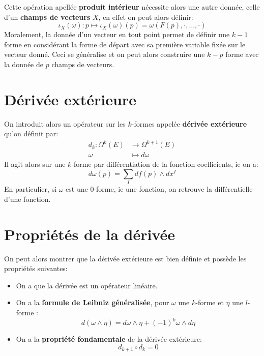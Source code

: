       Cette opération apellée \textbf{produit intérieur} nécessite alors une autre donnée, celle d'un \textbf{champs de vecteurs} $X$, en effet on peut alors définir:
      $$
         \iota_X(\omega) : p \mapsto \iota_X(\omega)(p) = \omega(F(p), \cdot, \ldots, \cdot)
      $$
      Moralement, la donnée d'un vecteur en tout point permet de définir une $k-1$ forme en considérant la forme de départ avec sa première variable fixée sur le vecteur donné. Ceci se généralise et on peut alors construire une \( k-p \) forme avec la donnée de \( p \) champs de vecteurs.
   \section{Dérivée extérieure}
   On introduit alors un opérateur sur les \(k\)-formes appelée \textbf{dérivée extérieure} qu'on définit par:
   \begin{align*}
      d_k : \Omega^k(E) &\longrightarrow \Omega^{k+1}(E)\\
      \omega &\longmapsto d\omega
   \end{align*}
   Il agit alors sur une \(k\)-forme par différentiation de la fonction coefficients, ie on a:
   \[
      d\omega(p) = \sum_I df(p) \wedge dx^I
   \]
   En particulier, si \( \omega \) est une \( 0 \)-forme, ie une fonction, on retrouve la différentielle d'une fonction.
   \section{Propriétés de la dérivée}
   On peut alors montrer que la dérivée extérieure est bien définie et possède les propriétés suivantes:
   \begin{itemize}
      \item On a que la dérivée est un opérateur linéaire.
      \item On a la \textbf{formule de Leibniz généralisée}, pour \(\omega\) une \(k\)-forme et \(\eta\) une \(l\)-forme : \[d(\omega \wedge \eta) = d\omega \wedge \eta + (-1)^k\omega \wedge d\eta\]
      \item On a la \textbf{propriété fondamentale} de la dérivée extérieure:
      \[ 
         d_{k+1} \circ d_k = 0 
      \]
   \end{itemize}
